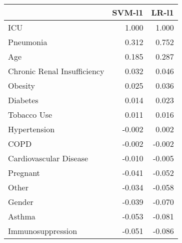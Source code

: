 \begin{tabular}{lrr}
\toprule
{} &  SVM-l1 &  LR-l1 \\
\midrule
ICU                         &   1.000 &  1.000 \\
Pneumonia                   &   0.312 &  0.752 \\
Age                         &   0.185 &  0.287 \\
Chronic Renal Insufficiency &   0.032 &  0.046 \\
Obesity                     &   0.025 &  0.036 \\
Diabetes                    &   0.014 &  0.023 \\
Tobacco Use                 &   0.011 &  0.016 \\
Hypertension                &  -0.002 &  0.002 \\
COPD                        &  -0.002 & -0.002 \\
Cardiovascular Disease      &  -0.010 & -0.005 \\
Pregnant                    &  -0.041 & -0.052 \\
Other                       &  -0.034 & -0.058 \\
Gender                      &  -0.039 & -0.070 \\
Asthma                      &  -0.053 & -0.081 \\
Immunosuppression           &  -0.051 & -0.086 \\
\bottomrule
\end{tabular}

